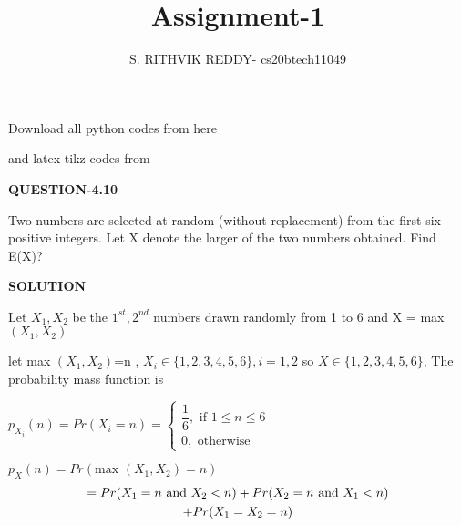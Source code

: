 \documentclass[a4paper]{article}
\title{Assignment-1}
\author{S. RITHVIK REDDY- cs20btech11049}
\date{}
\begin{document}
\maketitle
\noindent
Download all python codes from here

\begin{multicols*}{2}
\noindent
{}
    
\vspace{0.3cm}
and latex-tikz codes from  

\vspace{0.3cm}  
    
   
\vspace{0.5cm}
\textbf{QUESTION-4.10}
\vspace{0.5cm}

Two numbers are selected at random (without replacement) from the first six positive integers. Let X denote the larger of the two numbers obtained. Find E(X)?



\vspace{0.5cm}
\textbf{SOLUTION}
\vspace{0.5cm}

Let $X_1,X_2$ be the $1^{st},2^{nd}$ numbers drawn randomly from 1 to 6 and X = max $(X_1,X_2)$

let max $(X_1,X_2)$=n , $X_i\in \{ 1,2,3,4,5,6 \}, i=1,2$ so $X \in \{ 1,2,3,4,5,6 \}$, The probability mass function is 

\vspace{0.5cm}
$p_{X_i}(n)= Pr(X_i=n)= \begin{cases}
\dfrac{1}{6},  \text{ if } 1 \leq n \leq 6 \\
0,  \text{  otherwise }
\end{cases}$

 $p_X(n) =Pr(\text{max } (X_1,X_2)=n)$
 \begin{multline}
 \noindent
 =Pr(X_1=n\text{ and }X_2<n)
 +Pr(X_2=n\text{ and }X_1<n)\\+Pr(X_1=X_2=n)\label{eqn_(0.0.2)}
\end{multline}
 


\end{multicols*}
\end{document}
